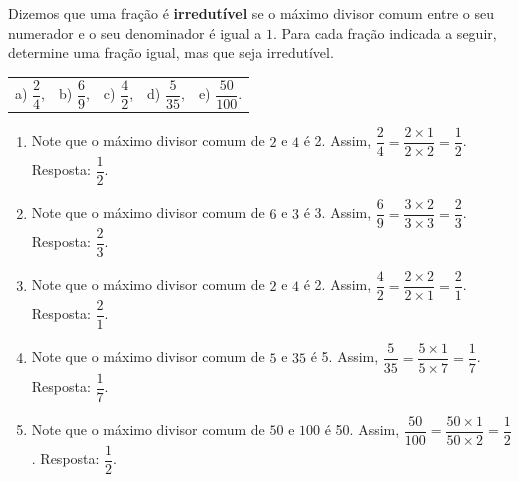 \documentclass[10 pt,usenames,dvipsnames, oneside]{article}
\begin{document}
Dizemos que uma fração é {\bf irredutível} se o máximo divisor comum entre o seu numerador e o seu denominador é igual a $1$. Para cada fração indicada a seguir, determine uma fração igual, mas que seja irredutível.
\vspace{.2cm}

\begin{tabular}{m{}m{}m{}m{}m{}}
a) $\dfrac{2}{4}$, & b) $\dfrac{6}{9}$, & c) $\dfrac{4}{2}$, & d) $\dfrac{5}{35}$, & e) $\dfrac{50}{100}$.
\end{tabular}

\ifdefined\prof
\begin{solucao}

\begin{enumerate}
\item Note que o máximo divisor comum de   $2$   e   $4$   é 2. Assim,
$\dfrac{2}{4} = \dfrac{2 \times 1}{2 \times 2} = \dfrac{1}{2}$. Resposta:
$\dfrac{1}{2}$.
 \item Note que o máximo divisor comum de   $6$   e   $3$   é 3. Assim,
$\dfrac{6}{9} = \dfrac{3 \times 2}{3 \times 3} = \dfrac{2}{3}$. Resposta:
$\dfrac{2}{3}$.
 \item Note que o máximo divisor comum de   $2$   e   $4$   é 2. Assim,
$\dfrac{4}{2} = \dfrac{2 \times 2}{2 \times 1} = \dfrac{2}{1}$. Resposta:
$\dfrac{2}{1}$.
 \item Note que o máximo divisor comum de   $5$   e   $35$   é 5. Assim,
$\dfrac{5}{35} = \dfrac{5 \times 1}{5 \times 7} = \dfrac{1}{7}$. Resposta:
$\dfrac{1}{7}$.
 \item Note que o máximo divisor comum de   $50$   e   $100$   é 50. Assim,
$\dfrac{50}{100} = \dfrac{50 \times 1}{50 \times 2} = \dfrac{1}{2}$. Resposta:
$\dfrac{1}{2}$.
\end{enumerate}

\end{solucao}
\fi
\end{document}
